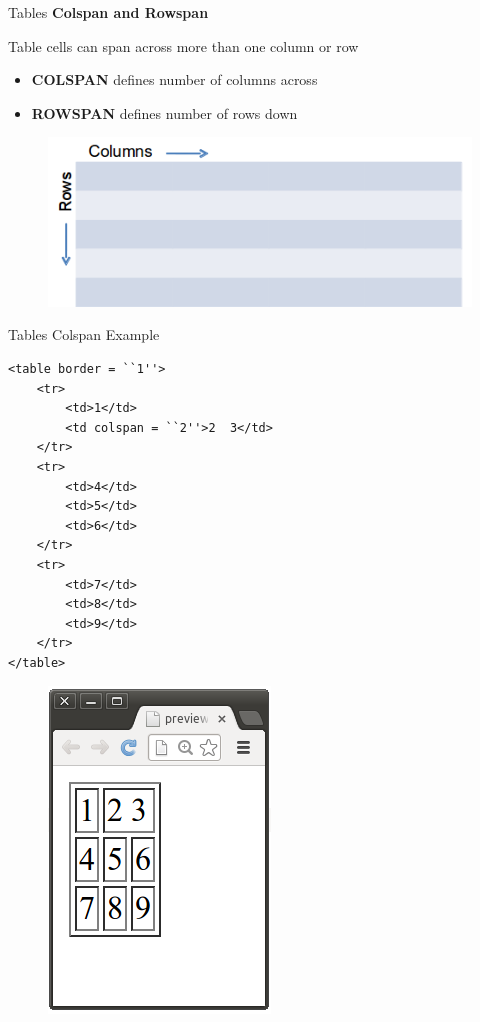 \documentclass[14pt]{beamer}
\begin{document}
\begin{frame}{Tables}
\textbf{Colspan and Rowspan}

\vspace{1pc}
Table cells can span across more than one column or row
\begin{itemize}
 \item \textbf{COLSPAN}  defines number of columns across 
 \item \textbf{ROWSPAN}  defines number of rows down
\end{itemize}
\begin{figure}[H]
 \centering
 \includegraphics[scale=.3]{tables-col-row-span.png}
\end{figure}
\end{frame}

\begin{frame}[fragile]{Tables}
Colspan Example

\begin{minipage}{7cm}
\begin{lstlisting}
<table border = ``1''>
    <tr>
        <td>1</td>
        <td colspan = ``2''>2  3</td>
    </tr>
    <tr>
        <td>4</td>
        <td>5</td>
        <td>6</td>
    </tr>
    <tr>
        <td>7</td>
        <td>8</td>
        <td>9</td>
    </tr>
</table>
\end{lstlisting}
\end{minipage}
\quad
\begin{minipage}{2cm}
\begin{figure}[H]
 \includegraphics[scale=.3]{tables-colspan-ex.png}
\end{figure}
\end{minipage}
\end{frame}
\end{document}
